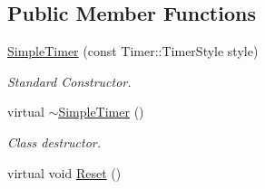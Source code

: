 \subsection*{Public Member Functions}
\begin{DoxyCompactItemize}
\item 
\hyperlink{classphys_1_1SimpleTimer_a3094be3aaf4cf65189604a413fa56f95}{SimpleTimer} (const Timer::TimerStyle style)
\begin{DoxyCompactList}\small\item\em Standard Constructor. \item\end{DoxyCompactList}\item 
\hypertarget{classphys_1_1SimpleTimer_ae7ef0b3d2b00b97d9c8a69654d9f6d74}{
virtual \hyperlink{classphys_1_1SimpleTimer_ae7ef0b3d2b00b97d9c8a69654d9f6d74}{$\sim$SimpleTimer} ()}
\label{d0/d15/classphys_1_1SimpleTimer_ae7ef0b3d2b00b97d9c8a69654d9f6d74}

\begin{DoxyCompactList}\small\item\em Class destructor. \item\end{DoxyCompactList}\item 
\hypertarget{classphys_1_1SimpleTimer_adea8d8b608e5abb96460c83f7b47f94f}{
virtual void \hyperlink{classphys_1_1SimpleTimer_adea8d8b608e5abb96460c83f7b47f94f}{Reset} ()}
\label{d0/d15/classphys_1_1SimpleTimer_adea8d8b608e5abb96460c83f7b47f94f}


\end{DoxyCompactItemize}
